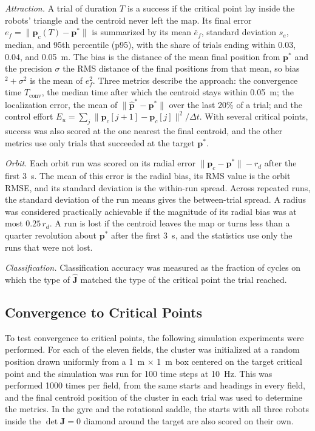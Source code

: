 \documentclass[lettersize,journal]{IEEEtran}
\newcommand{\rev}[1]{#1}
\begin{document}
\emph{Attraction.} A trial of duration $T$ is a success if the critical point lay inside the robots' triangle and the centroid never left the map. Its final error $e_f = \|\mathbf{p}_c(T) - \mathbf{p}^*\|$ is summarized by its mean $\bar{e}_f$, standard deviation $s_e$, median, and 95th percentile (p95), with the share of trials ending within 0.03, 0.04, and 0.05~m. The bias is the distance of the mean final position from $\mathbf{p}^*$ and the precision $\sigma$ the RMS distance of the final positions from that mean, so bias$^2 + \sigma^2$ is the mean of $e_f^2$. Three metrics describe the approach: the convergence time $T_{\mathrm{conv}}$, the median time after which the centroid stays within 0.05~m; the localization error, the mean of $\|\hat{\mathbf{p}}^* - \mathbf{p}^*\|$ over the last 20\% of a trial; and the control effort $E_u = \sum_j \|\mathbf{p}_c[j+1] - \mathbf{p}_c[j]\|^2/\Delta t$. With several critical points, success was also scored at the one nearest the final centroid, and the other metrics use only trials that succeeded at the target $\mathbf{p}^*$.

\emph{Orbit.} Each orbit run was scored on its radial error $\|\mathbf{p}_c - \mathbf{p}^*\| - r_d$ after the first \rev{3}~s. The mean of this error is the radial bias, its RMS value is the orbit RMSE, and its standard deviation is the within-run spread. Across repeated runs, the standard deviation of the run means gives the between-trial spread. A radius was considered practically achievable if the magnitude of its radial bias was at most $0.25\,r_d$. A run is lost if the centroid leaves the map or turns less than a quarter revolution about $\mathbf{p}^*$ after the first \rev{3}~s, and the statistics use only the runs that were not lost.

\emph{Classification.} Classification accuracy was measured as the fraction of cycles on which the type of $\hat{\mathbf{J}}$ matched the type of the critical point the trial reached.

\subsection{Convergence to Critical Points}

To test convergence to critical points, the following simulation experiments were performed. For each of the eleven fields, the cluster was initialized at a random position drawn uniformly from a 1~m $\times$ 1~m box centered on the target critical point and the simulation was run for 100 time steps at 10~Hz. This was performed 1000 times per field, from the same starts and headings in every field, and the final centroid position of the cluster in each trial was used to determine the metrics. In the gyre and the rotational saddle, the starts with all three robots inside the $\det\mathbf{J} = 0$ diamond around the target are also scored on their own.
\end{document}

